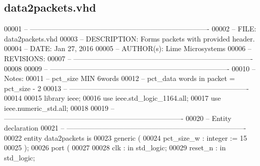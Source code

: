 \subsection{data2packets.\+vhd}
\label{data2packets_8vhd_source}

\begin{DoxyCode}
00001 \textcolor{keyword}{-- ---------------------------------------------------------------------------- }
00002 \textcolor{keyword}{-- FILE:    data2packets.vhd}
00003 \textcolor{keyword}{-- DESCRIPTION: Forms packets with provided header.}
00004 \textcolor{keyword}{-- DATE:    Jan 27, 2016}
00005 \textcolor{keyword}{-- AUTHOR(s):   Lime Microsystems}
00006 \textcolor{keyword}{-- REVISIONS:}
00007 \textcolor{keyword}{-- ---------------------------------------------------------------------------- }
00008 
00009 \textcolor{keyword}{-- ----------------------------------------------------------------------------}
00010 \textcolor{keyword}{-- Notes:}
00011 \textcolor{keyword}{-- pct\_size MIN 6words}
00012 \textcolor{keyword}{-- pct\_data words in packet = pct\_size - 2 }
00013 \textcolor{keyword}{-- ----------------------------------------------------------------------------}
00014 
00015 \textcolor{vhdlkeyword}{library }\textcolor{keywordflow}{ieee};
00016 \textcolor{vhdlkeyword}{use }ieee.std\_logic\_1164.\textcolor{keywordflow}{all};
00017 \textcolor{vhdlkeyword}{use }ieee.numeric\_std.\textcolor{keywordflow}{all};
00018 
00019 \textcolor{keyword}{-- ----------------------------------------------------------------------------}
00020 \textcolor{keyword}{-- Entity declaration}
00021 \textcolor{keyword}{-- ----------------------------------------------------------------------------}
00022 \textcolor{keywordflow}{entity }data2packets \textcolor{keywordflow}{is}
00023    \textcolor{keywordflow}{generic} \textcolor{vhdlchar}{(}
00024       \textcolor{vhdlchar}{pct_size_w}        \textcolor{vhdlchar}{:} \textcolor{comment}{integer} \textcolor{vhdlchar}{:=} \textcolor{vhdllogic}{}\textcolor{vhdllogic}{15}
00025    \textcolor{vhdlchar}{)};
00026    \textcolor{keywordflow}{port} \textcolor{vhdlchar}{(}
00027 
00028       \textcolor{vhdlchar}{clk}               \textcolor{vhdlchar}{:} \textcolor{keywordflow}{in} \textcolor{comment}{std\_logic};
00029       \textcolor{vhdlchar}{reset_n}           \textcolor{vhdlchar}{:} \textcolor{keywordflow}{in} \textcolor{comment}{std\_logic};

\end{DoxyCode}
